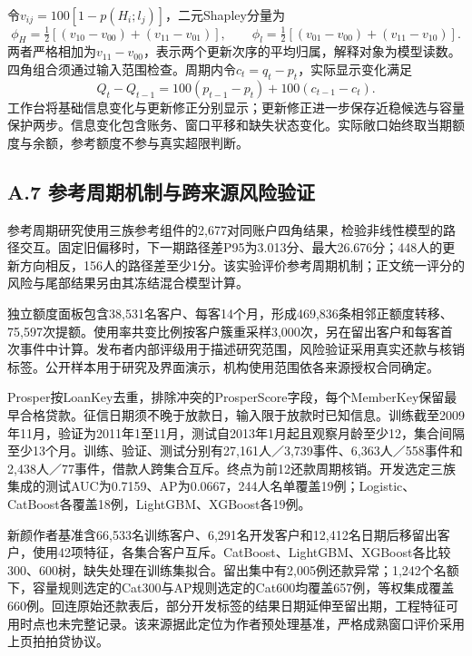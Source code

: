 令$v_{ij}=100[1-p(H_i;l_j)]$，二元Shapley分量为
\[
\phi_H=\tfrac12[(v_{10}-v_{00})+(v_{11}-v_{01})],\qquad
\phi_l=\tfrac12[(v_{01}-v_{00})+(v_{11}-v_{10})].
\]
两者严格相加为$v_{11}-v_{00}$，表示两个更新次序的平均归属，解释对象为模型读数。四角组合须通过输入范围检查。周期内令$c_t=q_t-p_t$，实际显示变化满足
\[
Q_t-Q_{t-1}=100(p_{t-1}-p_t)+100(c_{t-1}-c_t).
\]
工作台将基础信息变化与更新修正分别显示；更新修正进一步保存近稳候选与容量保护两步。信息变化包含账务、窗口平移和缺失状态变化。实际敞口始终取当期额度与余额，参考额度不参与真实超限判断。
\clearpage\subsection*{A.7 参考周期机制与跨来源风险验证}
参考周期研究使用三族参考组件的2,677对同账户四角结果，检验非线性模型的路径交互。固定旧偏移时，下一期路径差P95为3.013分、最大26.676分；448人的更新方向相反，156人的路径差至少1分。该实验评价参考周期机制；正文统一评分的风险与尾部结果另由其冻结混合模型计算。


独立额度面板包含38,531名客户、每客14个月，形成469,836条相邻正额度转移、75,597次提额。使用率共变比例按客户簇重采样3,000次，另在留出客户和每客首次事件中计算。发布者内部评级用于描述研究范围，风险验证采用真实还款与核销标签。公开样本用于研究及界面演示，机构使用范围依各来源授权合同确定。



\clearpage
Prosper按LoanKey去重，排除冲突的ProsperScore字段，每个MemberKey保留最早合格贷款。征信日期须不晚于放款日，输入限于放款时已知信息。训练截至2009年11月，验证为2011年1至11月，测试自2013年1月起且观察月龄至少12，集合间隔至少13个月。训练、验证、测试分别有27,161人／3,739事件、6,363人／558事件和2,438人／77事件，借款人跨集合互斥。终点为前12还款周期核销。开发选定三族集成的测试AUC为0.7159、AP为0.0667，244人名单覆盖19例；Logistic、CatBoost各覆盖18例，LightGBM、XGBoost各19例。

新颜作者基准含66,533名训练客户、6,291名开发客户和12,412名日期后移留出客户，使用42项特征，各集合客户互斥。CatBoost、LightGBM、XGBoost各比较300、600树，缺失处理在训练集拟合。留出集中有2,005例还款异常；1,242个名额下，容量规则选定的Cat300与AP规则选定的Cat600均覆盖657例，等权集成覆盖660例。回连原始还款表后，部分开发标签的结果日期延伸至留出期，工程特征可用时点也未完整记录。该来源据此定位为作者预处理基准，严格成熟窗口评价采用上页拍拍贷协议。


